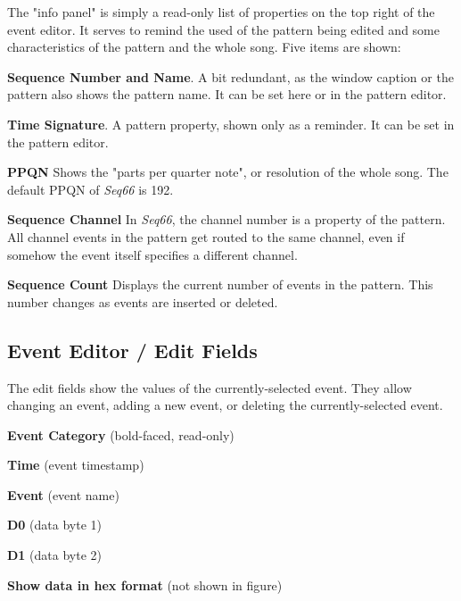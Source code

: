    The "info panel" is simply a read-only list of properties on the top right
   of the event editor.  It serves to remind the used of the pattern being
   edited and some characteristics of the pattern and the whole song.
   Five items are shown:

   \begin{enumber}
      \item \textbf{Sequence Number and Name}.
         A bit redundant, as the window caption or the pattern
         also shows the pattern name.
         It can be set here or in the pattern editor.
      \item \textbf{Time Signature}.
         A pattern property, shown only as a reminder.
         It can be set in the pattern editor.
      \item \textbf{PPQN}
         Shows the "parts per quarter note", or resolution of the
         whole song.  The default PPQN of \textsl{Seq66} is 192.
      \item \textbf{Sequence Channel}
         In \textsl{Seq66}, the channel number is a property of the
         pattern.  All channel events in the pattern get routed to the same
         channel, even if somehow the event itself specifies a different
         channel.
      \item \textbf{Sequence Count}
         Displays the current number of events in the pattern.
         This number changes as events are inserted or deleted.
   \end{enumber}

\subsection{Event Editor / Edit Fields}
\label{subsec:event_editor_fields}

   The edit fields show the values of the currently-selected event.  They allow
   changing an event, adding a new event, or deleting the currently-selected
   event.

   \begin{enumber}
      \item \textbf{Event Category} (bold-faced, read-only)
      \item \textbf{Time} (event timestamp)
      \item \textbf{Event} (event name)
      \item \textbf{D0} (data byte 1)
      \item \textbf{D1} (data byte 2)
      \item \textbf{Show data in hex format} (not shown in figure)
   \end{enumber}

